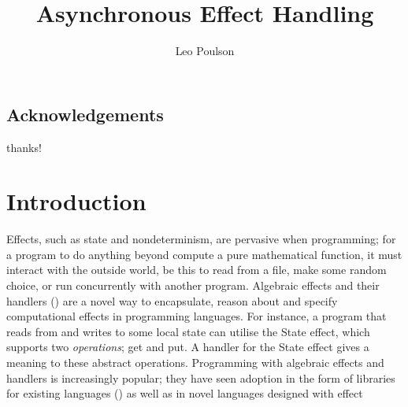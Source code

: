 \documentclass[msc,deptreport,cs]{infthesis} %
\begin{document}
\begin{preliminary}

\title{Asynchronous Effect Handling}

\author{Leo Poulson}


\maketitle

\section*{Acknowledgements}
thanks!

\tableofcontents

\end{preliminary}

\chapter{Introduction}

Effects, such as state and nondeterminism, are pervasive when programming; for a
program to do anything beyond compute a pure mathematical function, it must
interact with the outside world, be this to read from a file, make some random
choice, or run concurrently with another program. Algebraic effects and their
handlers (\cite{plotkin2013handling}) are a novel way to encapsulate, reason
about and specify computational effects in programming languages. For instance,
a program that reads from and writes to some local state can utilise the
\textsf{State} effect, which supports two \emph{operations}; \textsf{get} and
\textsf{put}. A handler for the \textsf{State} effect gives a meaning to these
abstract operations. Programming with algebraic effects and handlers is
increasingly popular; they have seen adoption in the form of libraries for
existing languages (\cite{kammar2013handlers, kiselyov2013extensible,
  brady2013programming}) as well as in novel languages designed with effect
\end{document}
